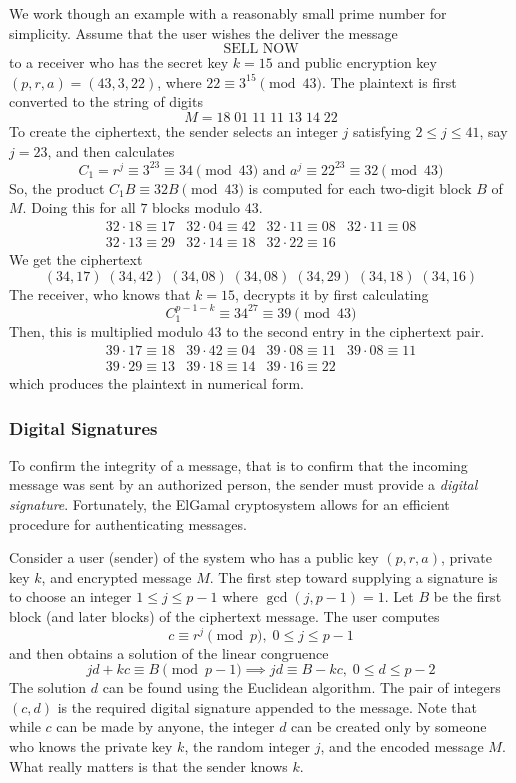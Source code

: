 \documentclass{article}
\theoremstyle{remark}
\theoremstyle{definition}
\begin{document}
We work though an example with a reasonably small prime number for simplicity. Assume that the user wishes the deliver the message 
\[\text{SELL NOW}\]
to a receiver who has the secret key $k=15$ and public encryption key $(p, r, a) = (43, 3, 22)$, where $22 \equiv 3^{15} \pmod{43}$. The plaintext is first converted to the string of digits 
\[M = 18\;01\;11\;11\;13\;14\;22\]
To create the ciphertext, the sender selects an integer $j$ satisfying $2 \leq j \leq 41$, say $j=23$, and then calculates
\[C_1 = r^j \equiv 3^{23} \equiv 34 \pmod{43} \text{ and } a^j \equiv 22^{23} \equiv 32 \pmod{43}\]
So, the product $C_1 B \equiv 32 B \pmod{43}$ is computed for each two-digit block $B$ of $M$. Doing this for all $7$ blocks modulo $43$. 
\[\begin{array}{cccc}
    32 \cdot 18 \equiv 17 & 32 \cdot 04 \equiv 42 & 32 \cdot 11 \equiv 08 & 32 \cdot 11 \equiv 08 \\
    32 \cdot 13 \equiv 29 & 32 \cdot 14 \equiv 18 & 32 \cdot 22 \equiv 16
\end{array}\]
We get the ciphertext 
\[(34,17)\;(34,42)\;(34,08)\;(34,08)\;(34,29)\;(34,18)\;(34,16)\]
The receiver, who knows that $k = 15$, decrypts it by first calculating
\[C_1^{p-1-k} \equiv 34^{27} \equiv 39 \pmod{43}\]
Then, this is multiplied modulo $43$ to the second entry in the ciphertext pair. 
\[\begin{array}{cccc}
    39 \cdot 17 \equiv 18 & 39 \cdot 42 \equiv 04 & 39 \cdot 08 \equiv 11 & 39 \cdot 08 \equiv 11 \\
    39 \cdot 29 \equiv 13 & 39 \cdot 18 \equiv 14 & 39 \cdot 16 \equiv 22
\end{array}\]
which produces the plaintext in numerical form. 

\subsubsection{Digital Signatures}
To confirm the integrity of a message, that is to confirm that the incoming message was sent by an authorized person, the sender must provide a \textit{digital signature}. Fortunately, the ElGamal cryptosystem allows for an efficient procedure for authenticating messages. 

Consider a user (sender) of the system who has a public key $(p, r, a)$, private key $k$, and encrypted message $M$. The first step toward supplying a signature is to choose an integer $1 \leq j\leq p-1$ where $\gcd(j, p-1) = 1$. Let $B$ be the first block (and later blocks) of the ciphertext message. The user computes 
\[c \equiv r^j \pmod{p}, \; 0 \leq j \leq p-1\]
and then obtains a solution of the linear congruence
\[jd + kc \equiv B \pmod{p-1} \implies jd \equiv B-kc, \; 0 \leq d \leq p-2\]
The solution $d$ can be found using the Euclidean algorithm. The pair of integers $(c, d)$ is the required digital signature appended to the message. Note that while $c$ can be made by anyone, the integer $d$ can be created only by someone who knows the private key $k$, the random integer $j$, and the encoded message $M$. What really matters is that the sender knows $k$. 
\end{document}
